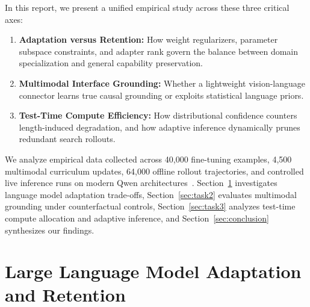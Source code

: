 \documentclass{article}
\begin{document}
In this report, we present a unified empirical study across these three critical axes:
\begin{enumerate}[leftmargin=1.5em,noitemsep,topsep=1.0pt,partopsep=0pt,parsep=0pt]
    \item \textbf{Adaptation versus Retention:} How weight regularizers, parameter subspace constraints, and adapter rank govern the balance between domain specialization and general capability preservation.
    \item \textbf{Multimodal Interface Grounding:} Whether a lightweight vision-language connector learns true causal grounding or exploits statistical language priors.
    \item \textbf{Test-Time Compute Efficiency:} How distributional confidence counters length-induced degradation, and how adaptive inference dynamically prunes redundant search rollouts.
\end{enumerate}
We analyze empirical data collected across 40,000 fine-tuning examples, 4,500 multimodal curriculum updates, 64,000 offline rollout trajectories, and controlled live inference runs on modern Qwen architectures~\cite{qwen2024qwen25, qwen2024qwen25vl}. Section~\ref{sec:task1} investigates language model adaptation trade-offs, Section~\ref{sec:task2} evaluates multimodal grounding under counterfactual controls, Section~\ref{sec:task3} analyzes test-time compute allocation and adaptive inference, and Section~\ref{sec:conclusion} synthesizes our findings.

\section{Large Language Model Adaptation and Retention}
\label{sec:task1}
\end{document}
